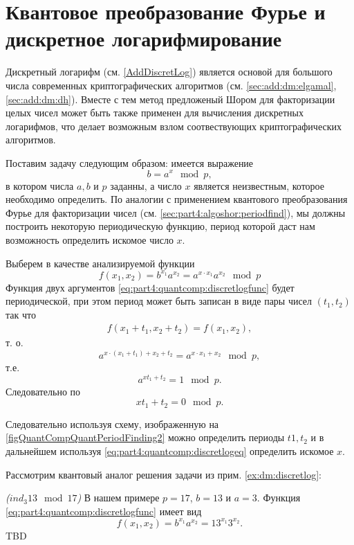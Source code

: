 \section{Квантовое преобразование Фурье и дискретное логарифмирование}
Дискретный логарифм (см. \autoref{AddDiscretLog}) является основой для
большого числа современных криптографических алгоритмов (см.
\autoref{sec:add:dm:elgamal}, \autoref{sec:add:dm:dh}). Вместе с тем 
метод предложеный Шором для факторизации целых чисел может быть также
применен для вычисления дискретных логарифмов, что делает возможным
взлом соотвествующих криптографических алгоритмов.

Поставим задачу следующим образом: имеется выражение 
\[
b = a^x \mod p,
\]
в котором числа $a, b$ и $p$ заданны, а число $x$ является
неизвестным, которое необходимо определить. По аналогии с применением
квантового преобразования Фурье для факторизации чисел (см.
\autoref{sec:part4:algoshor:periodfind}), мы должны
построить некоторую периодическую функцию, период которой даст нам
возможность определить искомое число $x$.

Выберем в качестве анализируемой функции
\begin{equation}
f\left(x_1, x_2\right) = b^{x_1}a^{x_2} = a^{x \cdot x_1} a^{x_2} \mod p
\label{eq:part4:quantcomp:discretlogfunc}
\end{equation}
Функция двух аргументов \eqref{eq:part4:quantcomp:discretlogfunc}
будет периодической, при этом период может быть записан в виде пары
чисел $(t_1, t_2)$ так что
\begin{eqnarray}
f\left(x_1 + t_1, x_2 + t_2\right) = f\left(x_1, x_2\right),
\nonumber
\end{eqnarray}
т. о. 
\[
a^{x \cdot \left( x_1 + t_1 \right) + x_2 + t_2} = a^{x \cdot x_1 + x_2}
\mod p,
\]
т.е. 
\[
a^{x t_1 + t_2} = 1 \mod p.
\]
Следовательно по 
\begin{equation}
x t_1 + t_2 = 0 \mod p.
\label{eq:part4:quantcomp:discretlogeq}
\end{equation}




Следовательно используя схему, изображенную на
\autoref{figQuantCompQuantPeriodFinding2} можно определить периоды
$t1, t_2$ и в дальнейшем используя
\eqref{eq:part4:quantcomp:discretlogeq} определить искомое $x$.


Рассмотрим квантовый аналог решения задачи из прим.
\ref{ex:dm:discretlog}:
\begin{example}
\emph{($ind_3{13} \mod{17}$)}
В нашем примере $p = 17$, $b=13$ и $a=3$. Функция
\eqref{eq:part4:quantcomp:discretlogfunc} имеет вид
\[
f\left(x_1, x_2\right) = b^{x_1}a^{x_2} = 13^{x_1}3^{x_2}.
\]
TBD
\label{ex:part4:quantcomp:discretlog:periodfinding}
\end{example}

